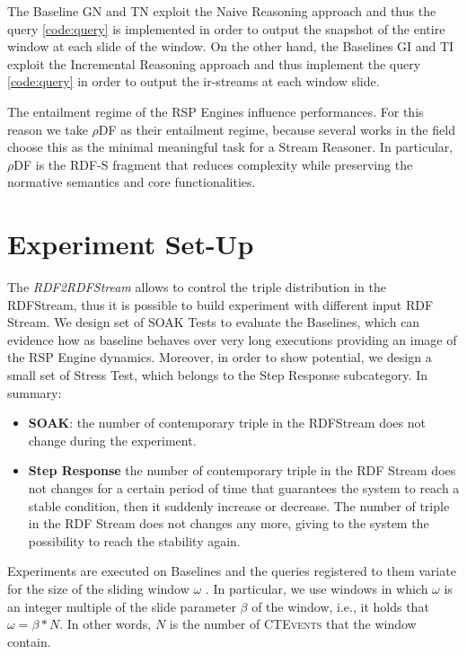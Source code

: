 The Baseline GN and TN exploit the Naive Reasoning approach and thus the query \ref{code:query} is implemented in order to output the snapshot of the entire window at each slide of the window. On the other hand, the Baselines GI and TI exploit the Incremental Reasoning approach and thus implement the query \ref{code:query} in order to output the ir-streams at each window slide.

The entailment regime of the RSP Engines influence performances. For this reason we take $\rho$DF  \cite{DBLP:conf/esws/MunozPG07} as their entailment regime, because several works in the field \cite{DBLP:conf/semweb/UrbaniMJHB13, Liu:2014:ERS:2567948.2577323} choose this as the minimal meaningful task for a Stream Reasoner. In particular, $\rho$DF is the RDF-S fragment that reduces complexity while preserving the normative semantics and core functionalities.


\section{Experiment Set-Up}

The \textit{RDF2RDFStream} allows to control the triple distribution in the RDFStream, thus it is possible to build experiment with different input RDF Stream. We design set of SOAK Tests to evaluate the Baselines, which can evidence how as baseline behaves over very long executions providing an image of the RSP Engine dynamics. Moreover, in order to show \name potential, we design a small set of Stress Test, which belongs to the Step Response subcategory. In summary:

\begin{itemize}
\item \textbf{SOAK}: the number of contemporary triple in the RDFStream does not change during the experiment.
\item \textbf{Step Response} the number of contemporary triple in the RDF Stream does not changes for a certain period of time that guarantees the system to reach a stable condition, then it suddenly increase or decrease. The number of triple in the RDF Stream does not changes any more, giving to the system the possibility to reach the stability again.
\end{itemize}

Experiments are executed on \name Baselines and the queries registered to them variate for the size of the sliding window $\omega$ . In particular, we use windows in which $\omega$ is an integer multiple of the slide parameter $\beta$ of the window, i.e., it holds that $\omega = \beta * N$. In other words, $N$ is the number of \textsc{CTEvents} that the window contain. 


